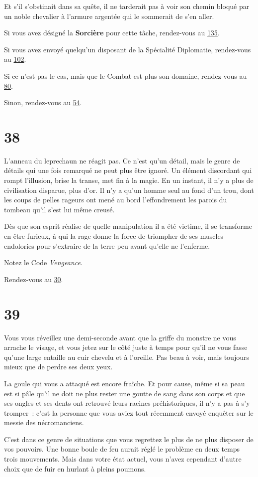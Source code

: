 \documentclass{report}
\newcommand{\gsection}[1]{
    \section{#1}
    \label{section-#1}
}
\newcommand{\glink}[1]{\hyperref[section-#1]{#1}}
\newcommand{\hero}[1]{
    \textbf{#1}
}
\begin{document}
Et s'il s'obstinait dans sa quête, il ne tarderait pas à voir son chemin bloqué par un noble chevalier à l'armure argentée qui le sommerait de s'en aller.

Si vous avez désigné la \hero{Sorcière} pour cette tâche, rendez-vous au \glink{135}.

Si vous avez envoyé quelqu'un disposant de la Spécialité Diplomatie, rendez-vous au \glink{102}.

Si ce n'est pas le cas, mais que le Combat est plus son domaine, rendez-vous au \glink{80}.

Sinon, rendez-vous au \glink{54}.

\gsection{38}

L'anneau du leprechaun ne réagit pas. Ce n'est qu'un détail, mais le genre de détails qui une fois remarqué ne peut plus être ignoré. Un élément discordant qui rompt l'illusion, brise la transe, met fin à la magie. En un instant, il n'y a plus de civilisation disparue, plus d'or. Il n'y a qu'un homme seul au fond d'un trou, dont les coups de pelles rageurs ont mené au bord l'effondrement les parois du tombeau qu'il s'est lui même creusé.

Dès que son esprit réalise de quelle manipulation il a été victime, il se transforme en être furieux, à qui la rage donne la force de triompher de ses muscles endolories pour s'extraire de la terre peu avant qu'elle ne l'enferme.

Notez le Code \emph{Vengeance}.

Rendez-vous au \glink{30}.

\gsection{39}

Vous vous réveillez une demi-seconde avant que la griffe du monstre ne vous arrache le visage, et vous jetez sur le côté juste à temps pour qu'il ne vous fasse qu'une large entaille au cuir chevelu et à l'oreille. Pas beau à voir, mais toujours mieux que de perdre ses deux yeux.

La goule qui vous a attaqué est encore fraîche. Et pour cause, même si sa peau est si pâle qu'il ne doit ne plus rester une goutte de sang dans son corps et que ses ongles et ses dents ont retrouvé leurs racines préhistoriques, il n'y a pas à s'y tromper :  c'est la personne que vous aviez tout récemment envoyé enquêter sur le messie des nécromanciens.

C'est dans ce genre de situations que vous regrettez le plus de ne plus disposer de vos pouvoirs. Une bonne boule de feu aurait réglé le problème en deux temps trois mouvements. Mais dans votre état actuel, vous n'avez cependant d'autre choix que de fuir en hurlant à pleins poumons.
\end{document}
